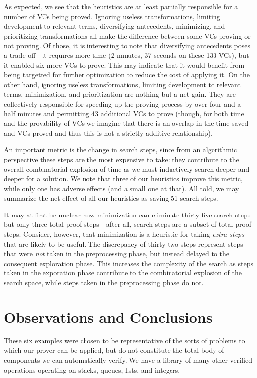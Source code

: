 As expected, we see that the heuristics are at least partially responsible for a number of VCs being proved.  Ignoring useless transformations, limiting development to relevant terms, diversifying antecedents, minimizing, and prioritizing transformations all make the difference between some VCs proving or not proving.  Of those, it is interesting to note that diversifying antecedents poses a trade off---it requires more time (2 minutes, 37 seconds on these 133 VCs), but it enabled six more VCs to prove.  This may indicate that it would benefit from being targetted for further optimization to reduce the cost of applying it.  On the other hand, ignoring useless transformations, limiting development to relevant terms, minimization, and prioritization are nothing but a net gain.  They are collectively responsible for speeding up the proving process by over four and a half minutes and permitting 43 additional VCs to prove (though, for both time and the provability of VCs we imagine that there is an overlap in the time saved and VCs proved and thus this is not a strictly additive relationship).

An important metric is the change in search steps, since from an algorithmic perspective these steps are the most expensive to take: they contribute to the overall combinatorial explosion of time as we must inductively search deeper and deeper for a solution.  We note that three of our heuristics improve this metric, while only one has adverse effects (and a small one at that).  All told, we may summarize the net effect of all our heuristics as saving 51 search steps.

It may at first be unclear how minimization can eliminate thirty-five search steps but only three total proof steps---after all, search steps are a subset of total proof steps.  Consider, however, that minimization is a heuristic for taking \emph{extra steps} that are likely to be useful.  The discrepancy of thirty-two steps represent steps that were \emph{not} taken in the preprocessing phase, but instead delayed to the consequent exploration phase.  This increases the complexity of the search as steps taken in the exporation phase contribute to the combinatorial explosion of the search space, while steps taken in the preprocessing phase do not.


\section{Observations and Conclusions\label{proverEvalConclusion}}
These six examples were chosen to be representative of the sorts of problems to which our prover can be applied, but do not constitute the total body of components we can automatically verify.  We have a library of many other verified operations operating on stacks, queues, lists, and integers.

